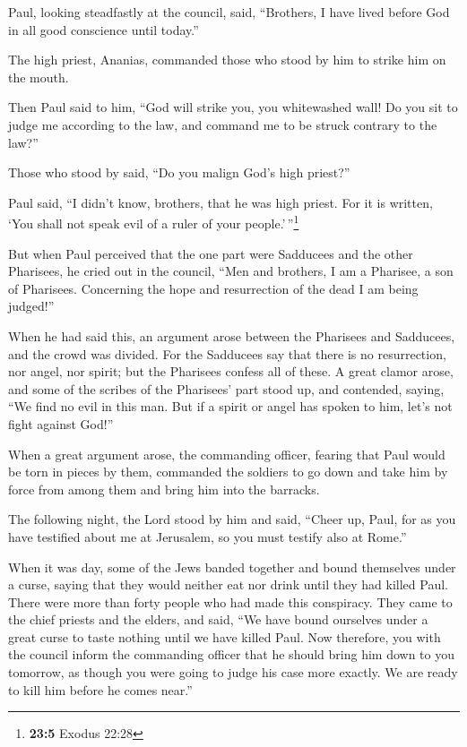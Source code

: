  Paul, looking steadfastly at the council, said,
``Brothers, I have lived before God in all good conscience until
today.''

 The high priest, Ananias, commanded those who stood by
him to strike him on the mouth.

 Then Paul said to him, ``God will strike you, you
whitewashed wall! Do you sit to judge me according to the law, and
command me to be struck contrary to the law?''

 Those who stood by said, ``Do you malign God's high
priest?''

 Paul said, ``I didn't know, brothers, that he was high
priest. For it is written, `You shall not speak evil of a ruler of your
people.'\,''\footnote{\textbf{23:5} Exodus 22:28}

 But when Paul perceived that the one part were Sadducees
and the other Pharisees, he cried out in the council, ``Men and
brothers, I am a Pharisee, a son of Pharisees. Concerning the hope and
resurrection of the dead I am being judged!''

 When he had said this, an argument arose between the
Pharisees and Sadducees, and the crowd was divided.  For
the Sadducees say that there is no resurrection, nor angel, nor spirit;
but the Pharisees confess all of these.  A great clamor
arose, and some of the scribes of the Pharisees' part stood up, and
contended, saying, ``We find no evil in this man. But if a spirit or
angel has spoken to him, let's not fight against God!''

 When a great argument arose, the commanding officer,
fearing that Paul would be torn in pieces by them, commanded the
soldiers to go down and take him by force from among them and bring him
into the barracks.

 The following night, the Lord stood by him and said,
``Cheer up, Paul, for as you have testified about me at Jerusalem, so
you must testify also at Rome.''

 When it was day, some of the Jews banded together and
bound themselves under a curse, saying that they would neither eat nor
drink until they had killed Paul.  There were more than
forty people who had made this conspiracy.  They came to
the chief priests and the elders, and said, ``We have bound ourselves
under a great curse to taste nothing until we have killed Paul.
 Now therefore, you with the council inform the
commanding officer that he should bring him down to you tomorrow, as
though you were going to judge his case more exactly. We are ready to
kill him before he comes near.''

